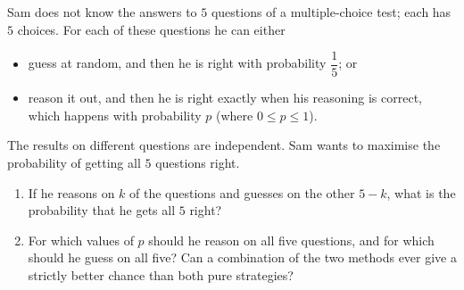 Sam does not know the answers to $5$ questions of a multiple-choice test; each has $5$ choices. For each of these questions he can either
\begin{itemize}
\item guess at random, and then he is right with probability $\dfrac{1}{5}$; or
\item reason it out, and then he is right exactly when his reasoning is correct, which happens with probability $p$ (where $0\le p\le1$).
\end{itemize}
The results on different questions are independent. Sam wants to maximise the probability of getting all $5$ questions right.
\begin{enumerate}
\item[(a)] If he reasons on $k$ of the questions and guesses on the other $5-k$, what is the probability that he gets all $5$ right?
\item[(b)] For which values of $p$ should he reason on all five questions, and for which should he guess on all five? Can a combination of the two methods ever give a strictly better chance than both pure strategies?
\end{enumerate}
